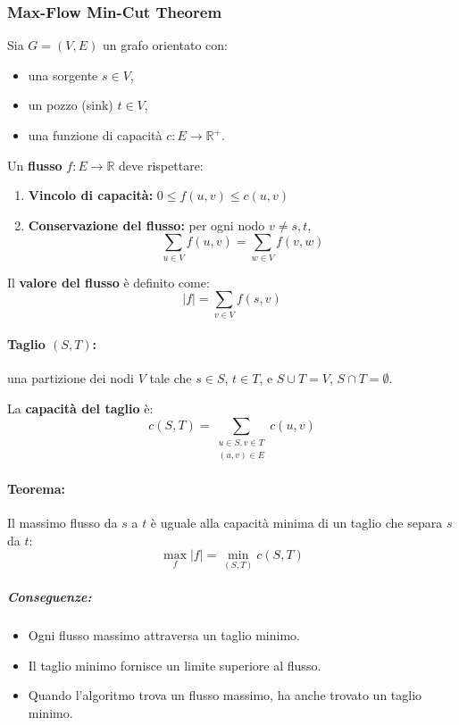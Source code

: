 \subsubsection*{Max-Flow Min-Cut Theorem}

Sia \( G = (V, E) \) un grafo orientato con:
\begin{itemize}
    \item una sorgente \( s \in V \),
    \item un pozzo (sink) \( t \in V \),
    \item una funzione di capacità \( c: E \rightarrow \mathbb{R}^+ \).
\end{itemize}

Un \textbf{flusso} \( f: E \rightarrow \mathbb{R} \) deve rispettare:
\begin{enumerate}
    \item \textbf{Vincolo di capacità:} \( 0 \leq f(u,v) \leq c(u,v) \)
    \item \textbf{Conservazione del flusso:} per ogni nodo \( v \neq s, t \),
    \[
    \sum_{u \in V} f(u,v) = \sum_{w \in V} f(v,w)
    \]
\end{enumerate}

Il \textbf{valore del flusso} è definito come:
\[
|f| = \sum_{v \in V} f(s,v)
\]

\paragraph{Taglio \( (S, T) \):} una partizione dei nodi \( V \) tale che \( s \in S \), \( t \in T \), e \( S \cup T = V \), \( S \cap T = \emptyset \).

La \textbf{capacità del taglio} è:
\[
c(S, T) = \sum_{\substack{u \in S, v \in T \\ (u,v) \in E}} c(u,v)
\]

\paragraph{Teorema:} Il massimo flusso da \( s \) a \( t \) è uguale alla capacità minima di un taglio che separa \( s \) da \( t \):
\[
\max_f |f| = \min_{(S,T)} c(S,T)
\]

\subparagraph{Conseguenze:}
\begin{itemize}
    \item Ogni flusso massimo attraversa un taglio minimo.
    \item Il taglio minimo fornisce un limite superiore al flusso.
    \item Quando l’algoritmo trova un flusso massimo, ha anche trovato un taglio minimo.
\end{itemize}

